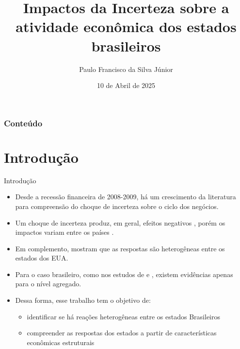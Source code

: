 \documentclass[aspectratio=169, 10pt]{beamer}
\title[\textcolor{white}{Incerteza - Estados Brasileiros}]{Impactos da Incerteza sobre a atividade econômica dos estados brasileiros}
\author[Silva Junior]{Paulo Francisco da Silva Júnior}
\institute[UFPE]{Universidade Federal de Pernambuco}
\date[\textcolor{white}{10 de abril de 2025}]
{10 de Abril de 2025}
\begin{document}
\frame{\titlepage}
\begin{frame}
\frametitle{Conteúdo}
\tableofcontents
\end{frame}
\justifying

\section{Introdução}
\begin{frame}{Introdução}
\begin{itemize}
    \item Desde a recessão financeira de 2008-2009, há um crescimento da literatura para compreensão do choque de incerteza sobre o ciclo dos negócios.
    \item Um choque de incerteza produz, em geral, efeitos negativos \cite{haddow2013macroeconomic, bloom2014fluctuations}, porém os impactos variam entre os países \cite{bloom2017observations}. 
    \item Em complemento,  mostram que as respostas são heterogêneas entre os estados dos EUA.
    \item Para o caso brasileiro, como nos estudos de  e , existem evidências apenas para o nível agregado.
    \item Dessa forma, esse trabalho tem o objetivo de:
    \begin{itemize}
        \item identificar se há reações heterogêneas entre os estados Brasileiros
        \item compreender as respostas dos estados a partir de características econômicas estruturais
    \end{itemize}
\end{itemize}
\end{frame}
\end{document}
